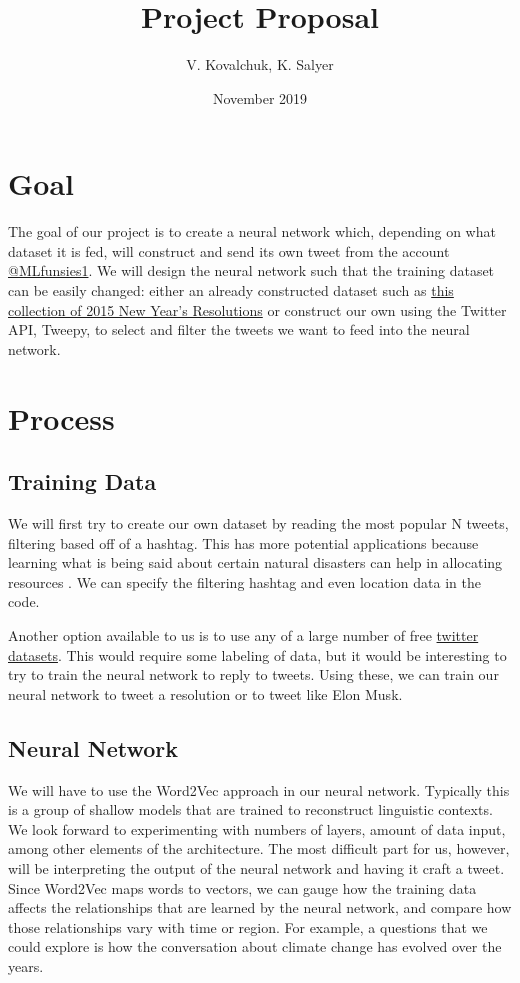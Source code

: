 \documentclass{article}
\title{Project Proposal}
\author{V. Kovalchuk, K. Salyer}
\date{November 2019}
\begin{document}
\maketitle

\section{Goal}
The goal of our project is to create a neural network which, depending on what dataset it is fed, will construct and send its own tweet from the account \href{https://twitter.com/mlfunsies1}{@MLfunsies1}. We will design the neural network such that the training dataset can be easily changed: either an already constructed dataset such as \href{https://data.world/crowdflower/2015-new-years-resolutions}{this collection of 2015 New Year's Resolutions} or construct our own using the Twitter API, Tweepy, to select and filter the tweets we want to feed into the neural network.

\section{Process}
\subsection{Training Data}
We will first try to create our own dataset by reading the most popular N tweets, filtering based off of a hashtag. This has more potential applications because learning what is being said about certain natural disasters can help in allocating resources \cite{naturaldisaster}. We can specify the filtering hashtag and even location data in the code. 

Another option available to us is to use any of a large number of free \href{https://github.com/shaypal5/awesome-twitter-data}{twitter datasets}. This would require some labeling of data, but it would be interesting to try to train the neural network to reply to tweets. Using these, we can train our neural network to tweet a resolution or to tweet like Elon Musk. 

\subsection{Neural Network}
We will have to use the Word2Vec approach in our neural network. Typically this is a group of shallow models that are trained to reconstruct linguistic contexts. We look forward to experimenting with numbers of layers, amount of data input, among other elements of the architecture. The most difficult part for us, however, will be interpreting the output of the neural network and having it craft a tweet. Since Word2Vec maps words to vectors, we can gauge how the training data affects the relationships that are learned by the neural network, and compare how those relationships vary with time or region. For example, a questions that we could explore is how the conversation about climate change has evolved over the years. 
\end{document}
